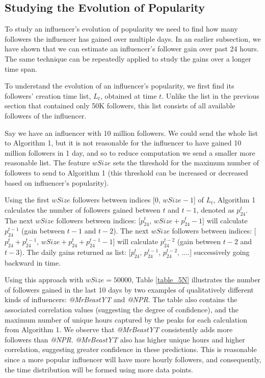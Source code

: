 \subsection{Studying the Evolution of Popularity}

To study an influencer's evolution of popularity we need to find  how many followers the influencer has gained over multiple days. In an earlier subsection, we have shown that we can estimate an influencer's follower gain over past 24 hours. 
The same technique can be repeatedly applied to study the gains  over a longer time span. 

To understand the evolution of an influencer's popularity, we first find its followers' creation time list, $L_t$, obtained at time $t$. Unlike the list in the previous section that contained only 50K followers, this list consists of all available followers of the influencer. 

Say we have an influencer with 10 million followers. We could send the whole list to Algorithm 1, but it is not reasonable for the influencer to have gained 10 million followers in 1 day, and so to reduce computation we send a smaller more reasonable list. The feature $wSize$ sets the threshold for the maximum number of followers to send to Algorithm 1 (this threshold can be increased or decreased based on influencer's popularity).
 
 Using the first $wSize$ followers between indices [0, $wSize -1$] of $L_t$, Algorithm 1 calculates the number of followers gained %
 between $t$ and $t-1$, denoted as $p_{24}^t$. The next $wSize$ followers between indices: [$p_{24}^{t}$, $wSize + p_{24}^{t}-1$] will calculate $p_{24}^{t-1}$ (gain between $t-1$ and $t-2$). The next $wSize$ followers between indices: [$p_{24}^{t}+p_{24}^{t-1}$, $wSize + p_{24}^t+p_{24}^{t-1} -1$] will calculate $p_{24}^{t-2}$ (gain between $t-2$ and $t-3$). The daily gains returned as list: [$p_{24}^t$, $p_{24}^{t-1}$, $p_{24}^{t-2}$, ....] successively going backward in time.
 
 Using this approach with $wSize=50000$, Table \ref{table_5N} illustrates the number of followers gained in the last 10 days by two examples of qualitatively different kinds of influencers: \emph{@MrBeastYT} and \emph{@NPR}. The table also contains the associated correlation values (suggesting the degree of confidence), and the maximum number of unique hours captured by the peaks for each calculation from Algorithm 1. We observe that \emph{@MrBeastYT} consistently adds more followers %
 than \emph{@NPR}. \emph{@MrBeastYT} also has higher unique hours and higher correlation, suggesting greater confidence in these predictions. This is reasonable since a more popular influencer will have more hourly followers, and consequently, the time distribution will be formed using more data points.
 
